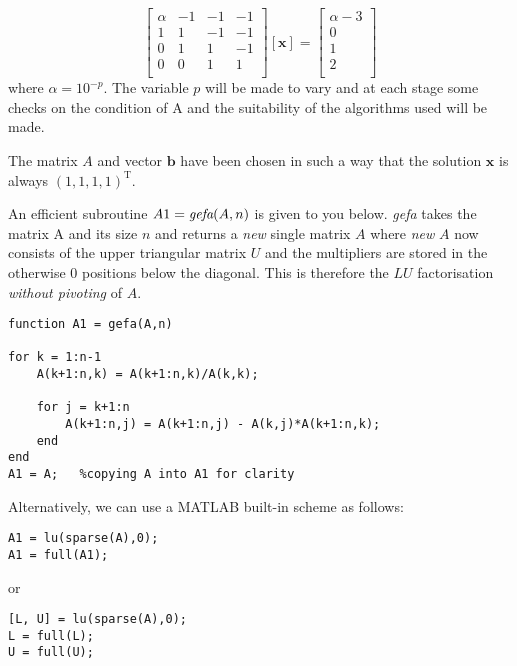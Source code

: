 \documentclass[12pt]{article}
\def\MM#1{\boldsymbol{#1}}
\begin{document}
\begin{equation}
	\begin{bmatrix}
       \alpha & -1 & -1 & -1   \\[0.3em]
       1& 1 & -1 & -1        \\[0.3em]
       0& 1 & 1 & -1			  \\[0.3em]
			 0& 0 & 1 & 1			  \\[0.3em]
  \end{bmatrix}
	[\MM{x}] =
	\begin{bmatrix}
       \alpha-3 \\[0.3em]
       0\\[0.3em]
       1\\[0.3em]
			 2\\[0.3em]
  \end{bmatrix}
\end{equation}
where $\alpha = 10^{-p}$. The variable $p$ will be made to vary and at each stage some checks on the condition of A and the suitability of the algorithms used will be made. 

The matrix $A$ and vector $\MM{b}$ have been chosen in such a way that the solution $\MM{x}$ is always $(1, 1, 1, 1)^\mathrm{T}$. 

An efficient subroutine $A1 = \mathrm{\emph{gefa}}(A,n)$ is given to you below. \emph{gefa} takes the matrix A and its size $n$ and returns a \emph{new} single matrix $A$ where \emph{new} $A$ now consists of the upper triangular matrix $U$ and the multipliers are stored in the otherwise 0 positions below the diagonal. This is therefore the $LU$ factorisation \emph{without pivoting} of $A$.
\begin{lstlisting} 
function A1 = gefa(A,n)

for k = 1:n-1
    A(k+1:n,k) = A(k+1:n,k)/A(k,k);
    
    for j = k+1:n
        A(k+1:n,j) = A(k+1:n,j) - A(k,j)*A(k+1:n,k);
    end
end
A1 = A;   %copying A into A1 for clarity
\end{lstlisting}

Alternatively, we can use a MATLAB built-in scheme as follows:
\begin{lstlisting} 
A1 = lu(sparse(A),0);
A1 = full(A1);
\end{lstlisting}

or

\begin{lstlisting} 
[L, U] = lu(sparse(A),0);
L = full(L);
U = full(U);
\end{lstlisting}
\end{document}
